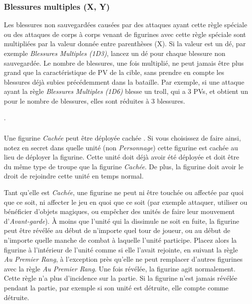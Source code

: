 \subsubsection*{Blessures multiples (X, Y)}

Les blessures non sauvegardées causées par des attaques ayant cette règle spéciale ou des attaques de corps à corps venant de figurines avec cette règle spéciale sont multipliées par la valeur donnée entre parenthèses (X). Si la valeur est un dé, par exemple \emph{Blessures Multiples (1D3)}, lancez un dé pour chaque blessure non sauvegardée. Le nombre de blessures, une fois multiplié, ne peut jamais être plus grand que la caractéristique de PV de la cible, sans prendre en compte les blessures déjà subies précédemment dans la bataille. Par exemple, si une attaque ayant la règle \emph{Blessures Multiples (1D6)} blesse un troll, qui a 3 PVs, et obtient un  pour le nombre de blessures, elles sont réduites à 3 blessures.

.


\subsubsection*{}

Une figurine \emph{Cachée} peut être déployée \og cachée \fg . Si vous choisissez de faire ainsi, notez en secret dans quelle unité (non \emph{Personnage}) cette figurine est cachée au lieu de déployer la figurine. Cette unité doit déjà avoir été déployée et doit être du même type de troupe que la figurine \emph{Cachée}. De plus, la figurine doit avoir le droit de rejoindre cette unité en temps normal.

Tant qu'elle est \emph{Cachée}, une figurine ne peut ni être touchée ou affectée par quoi que ce soit, ni affecter le jeu en quoi que ce soit (par exemple attaquer, utiliser ou bénéficier d'objets magiques, ou empêcher des unités de faire leur mouvement d'\emph{Avant-garde}). À moins que l'unité qui la dissimule ne soit en fuite, la figurine peut être révélée au début de n'importe quel tour de joueur, ou au début de n'importe quelle manche de combat à laquelle l'unité participe. Placez alors la figurine à l'intérieur de l'unité comme si elle l'avait rejointe, en suivant la règle \emph{Au Premier Rang}, à l'exception près qu'elle ne peut remplacer d'autres figurines avec la règle \emph{Au Premier Rang}. Une fois révélée, la figurine agit normalement. Cette règle n'a plus d'incidence sur la partie. Si la figurine n'est jamais révélée pendant la partie, par exemple si son unité est détruite, elle compte comme détruite.

